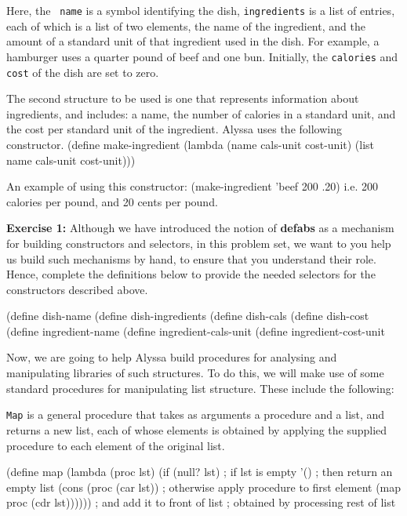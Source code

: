 Here, the {\tt
name} is a symbol identifying the dish, {\tt ingredients} is a list of
entries, each of which
is a list of two elements, the name of the ingredient, and the amount of
a standard unit of that ingredient used in the dish.  For example, a
hamburger uses a quarter pound of beef and one bun.  Initially, the
{\tt calories} and {\tt cost} of the dish are set to zero.

The second structure to be used is one that represents information about
ingredients, and includes: a name, the number of calories
in a standard unit, and the cost per standard unit of the ingredient.
Alyssa uses the following constructor.
\beginlisp
(define make-ingredient
  (lambda (name cals-unit cost-unit)
     (list name cals-unit cost-unit)))
\endlisp

An example of using this constructor:
\beginlisp
(make-ingredient 'beef 200 .20)
\endlisp
i.e. 200 calories per pound, and 20 cents per pound.

{\bf Exercise 1:}  Although we have introduced the notion of {\bf
defabs} as a mechanism for building constructors and selectors, in this
problem set, we want to you help us build such mechanisms by hand, to
ensure that you understand their role.  Hence, complete the definitions
below to provide the needed selectors for the constructors described
above.

\beginlisp
(define dish-name 
\pbrk
(define dish-ingredients 
\pbrk
(define dish-cals 
\pbrk
(define dish-cost 
\pbrk
(define ingredient-name 
\pbrk
(define ingredient-cals-unit 
\pbrk
(define ingredient-cost-unit 
\endlisp


\vskip 20pt

Now, we are going to help Alyssa build procedures for analysing and
manipulating libraries of such structures.  To do this, we will make use
of some standard procedures for manipulating list structure.  These
include the following:

{\tt Map} is a general procedure that takes as arguments a procedure and
a list, and returns a new list, each of whose elements is obtained by
applying the supplied procedure to each element of the original list.

\beginlisp
(define map
  (lambda (proc lst)
    (if (null? lst)   ; if lst is empty
        '()           ; then return an empty list
        (cons (proc (car lst))   ; otherwise apply procedure to first element
              (map proc (cdr lst)))))) ; and add it to front of list
                                       ; obtained by processing rest of list
\endlisp


